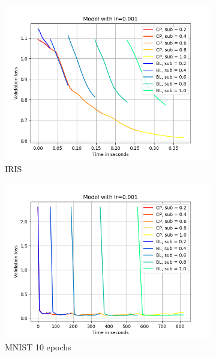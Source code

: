 \begin{figure}[h]
    \centering
    \begin{subfigure}[b]{0.24\textwidth}
        \centering
        \includegraphics[width=\textwidth]{figures/22_07/iris/loss_time_0.001.png}
        \caption{IRIS}
        \label{fig:4a}
    \end{subfigure}
    \begin{subfigure}[b]{0.24\textwidth}
        \centering
        \includegraphics[width=\textwidth]{figures/22_07/10ep/loss_time_0.001.png}
        \caption{MNIST 10 epochs}
        \label{fig:4b}
    \end{subfigure}
    \begin{subfigure}[b]{0.24\textwidth}

\end{subfigure}
\end{figure}
